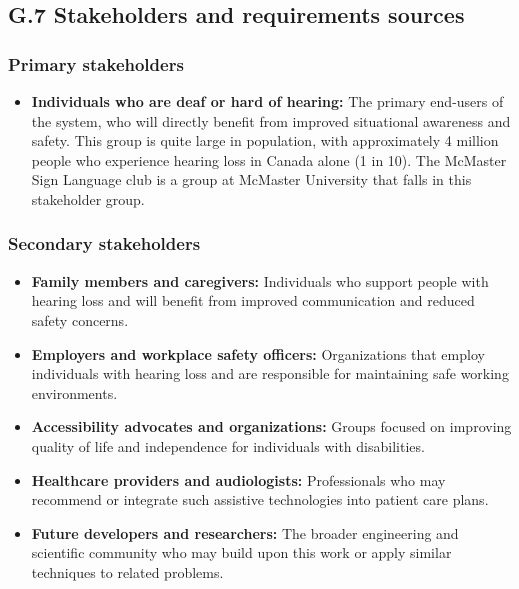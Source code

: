 \documentclass[12pt]{article}
\theoremstyle{definition}
\begin{document}
\subsection{G.7 Stakeholders and requirements sources}

\subsubsection{Primary stakeholders}

\begin{itemize}
\item \textbf{Individuals who are deaf or hard of hearing:} The primary
end-users of the system, who will directly benefit from improved
situational awareness and safety. This group is quite large in population,
with approximately 4 million people who experience hearing loss 
in Canada alone (1 in 10). The McMaster Sign Language club is a group at
McMaster University that falls in this stakeholder group.

\end{itemize}

\subsubsection{Secondary stakeholders}

\begin{itemize}
\item \textbf{Family members and caregivers:} Individuals who support people
with hearing loss and will benefit from improved communication and reduced
safety concerns.

\item \textbf{Employers and workplace safety officers:} Organizations that
employ individuals with hearing loss and are responsible for maintaining
safe working environments.

\item \textbf{Accessibility advocates and organizations:} Groups focused on
improving quality of life and independence for individuals with disabilities.

\item \textbf{Healthcare providers and audiologists:} Professionals who may
recommend or integrate such assistive technologies into patient care plans.

\item \textbf{Future developers and researchers:} The broader engineering
and scientific community who may build upon this work or apply similar
techniques to related problems.
\end{itemize}
\end{document}
